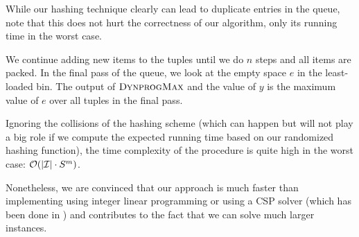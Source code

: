 While our hashing technique clearly can lead to duplicate entries in
the queue, note that this does not hurt the correctness of our
algorithm, only its running time in the worst case.

We continue adding new items to the tuples until we do $n$ steps and
all items are packed. In the final pass of the queue, we look at the
empty space $e$ in the least-loaded bin. The output of $\textsc{DynprogMax}$
and the value of $y$ is the maximum value of $e$ over all tuples in
the final pass.

Ignoring the collisions of the hashing scheme (which can happen but
will not play a big role if we compute the expected running time based
on our randomized hashing function), the time complexity of the
procedure \MaxFeas is quite high in the worst case: ${\mathcal{O}}(|{\mathcal I}|\cdot
S^m)$.

Nonetheless, we are convinced that our approach is much faster than
implementing \MaxFeas using integer linear programming or using a CSP
solver (which has been done in \cite{gabay2013lbv2}) and contributes
to the fact that we can solve much larger instances.
